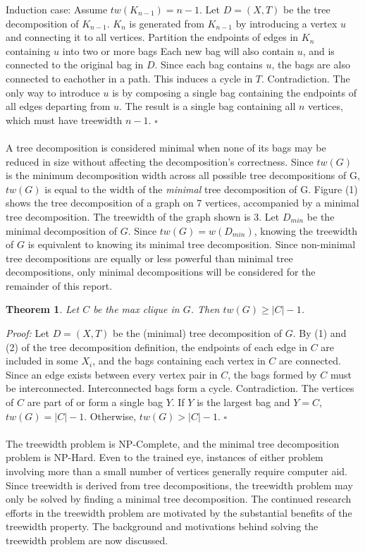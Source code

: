 \documentclass[12pt,conference]{IEEEtran}
\theoremstyle{plain}
\newtheorem{theorem}{Theorem}
\begin{document}
Induction case: Assume $tw(K_{n-1}) = n-1$. Let $D=(X,T)$ be the tree decomposition of $K_{n-1}$. $K_{n}$ is generated from $K_{n-1}$ by introducing a vertex $u$ and connecting it to all vertices. Partition the endpoints of edges in $K_{n}$ containing $u$ into two or more bags Each new bag will also contain $u$, and is connected to the original bag in $D$. Since each bag contains $u$, the bags are also connected to eachother in a path. This induces a cycle in $T$. Contradiction. The only way to introduce $u$ is by composing a single bag containing the endpoints of all edges departing from $u$. The result is a single bag containing all $n$ vertices, which must have treewidth $n-1$. $\square$
\\
\\
A tree decomposition is considered minimal when none of its bags may be reduced in size without affecting the decomposition's correctness. Since $tw(G)$ is the minimum decomposition width across all possible tree decompositions of G, $tw(G)$ is equal to the width of the \textit{minimal} tree decomposition of G. Figure (1) shows the tree decomposition of a graph on 7 vertices, accompanied by a minimal tree decomposition. The treewidth of the graph shown is 3. Let $D_{min}$ be the minimal decomposition of $G$. Since $tw(G) = w(D_{min})$, knowing the treewidth of $G$ is equivalent to knowing its minimal tree decomposition. Since non-minimal tree decompositions are equally or less powerful than minimal tree decompositions, only minimal decompositions will be considered for the remainder of this report.

\begin{theorem}
  Let $C$ be the max clique in $G$. Then $tw(G) \geq |C|-1$.
\end{theorem}

\textit{Proof:} Let $D=(X,T)$ be the (minimal) tree decomposition of $G$. By (1) and (2) of the tree decomposition definition, the endpoints of each edge in $C$ are included in some $X_{i}$, and the bags containing each vertex in $C$ are connected. Since an edge exists between every vertex pair in $C$, the bags formed by $C$ must be interconnected. Interconnected bags form a cycle. Contradiction. The vertices of $C$ are part of or form a single bag $Y$. If $Y$ is the largest bag and $Y=C$, $tw(G)=|C|-1$. Otherwise, $tw(G) > |C|-1$. $\square$
\\
\\
The treewidth problem is NP-Complete, and the minimal tree decomposition problem is NP-Hard. Even to the trained eye, instances of either problem involving more than a small number of vertices generally require computer aid. Since treewidth is derived from tree decompositions, the treewidth problem may only be solved by finding a minimal tree decomposition. The continued research efforts in the treewidth problem are motivated by the substantial benefits of the treewidth property. The background and motivations behind solving the treewidth problem are now discussed.
\end{document}
